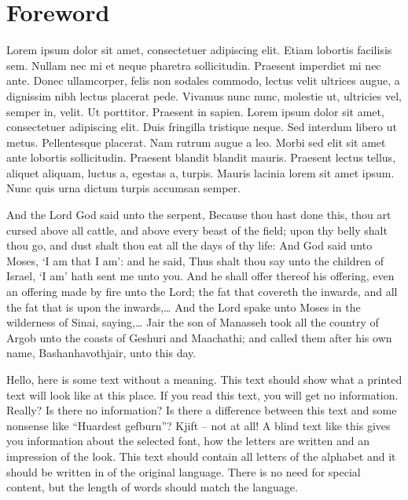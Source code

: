 \chapter*{Foreword}
    Lorem ipsum dolor sit amet, consectetuer adipiscing elit. Etiam
    lobortis facilisis sem. Nullam nec mi et neque pharetra
    sollicitudin. Praesent imperdiet mi nec ante. Donec ullamcorper,
    felis non sodales commodo, lectus velit ultrices augue, a
    dignissim nibh lectus placerat pede. Vivamus nunc nunc, molestie
    ut, ultricies vel, semper in, velit. Ut porttitor. Praesent in
    sapien. Lorem ipsum dolor sit amet, consectetuer adipiscing elit.
    Duis fringilla tristique neque. Sed interdum libero ut metus.
    Pellentesque placerat. Nam rutrum augue a leo. Morbi sed elit sit
    amet ante lobortis sollicitudin. Praesent blandit blandit mauris.
    Praesent lectus tellus, aliquet aliquam, luctus a, egestas a,
    turpis. Mauris lacinia lorem sit amet ipsum. Nunc quis urna dictum
    turpis accumsan semper.
    
     And the Lord God said unto the serpent, Because thou hast done this,
    thou art cursed above all cattle, and above every beast of the
    field; upon thy belly shalt thou go, and dust shalt thou eat all the
    days of thy life:
    And God said unto Moses, `I am that I am': and he said, Thus shalt
    thou say unto the children of Israel, `I am' hath sent me unto you.
    And he shall offer thereof his offering, even an offering made by
    fire unto the Lord; the fat that covereth the inwards, and all the
    fat that is upon the inwards,\ldots
    And the Lord spake unto Moses in the wilderness of Sinai,
    saying,\ldots
    Jair the son of Manasseh took all the country of Argob unto the
    coasts of Geshuri and Maachathi; and called them after his own name,
    Bashanhavothjair, unto this day.%


Hello, here is some text without a meaning. 
    This text should show what a printed text will look like at this
    place. If you read this text, you will get no
    information. Really? Is there no information?
    Is there a difference between this text and some nonsense like
    ``Huardest gefburn''? Kjift -- not at all! A blind text
    like this gives you information  about the selected
    font, how the letters are written and an impression  of the
    look. This text should contain {all
    letters of the alphabet} and it should be written in of the original
    language. There is no need for  special
    content, but the length of words should match the
    language.    \vadjust{\vfill\pagebreak}


